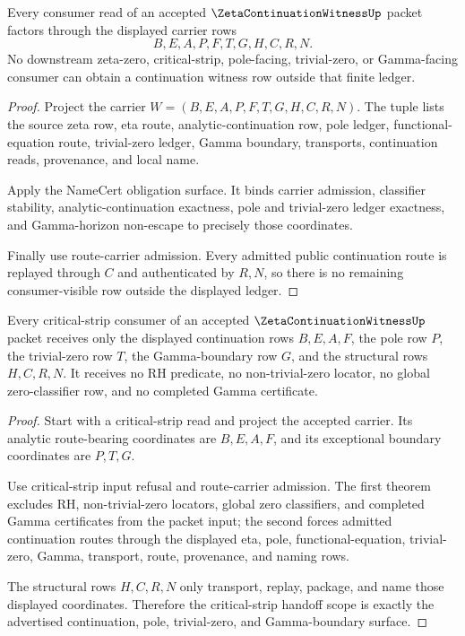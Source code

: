\begin{theorem}
\label{thm:zeta-continuation-witness-consumer-ledger-exhaustion}
Every consumer read of an accepted $\ZetaContinuationWitnessUp$ packet factors through the displayed carrier rows
$$
B,E,A,P,F,T,G,H,C,R,N.
$$
No downstream zeta-zero, critical-strip, pole-facing, trivial-zero, or Gamma-facing consumer can obtain a continuation witness row outside that finite ledger.
\end{theorem}
\begin{proof}
Project the carrier $W=(B,E,A,P,F,T,G,H,C,R,N)$. The tuple lists the source zeta row, eta route, analytic-continuation row, pole ledger, functional-equation route, trivial-zero ledger, Gamma boundary, transports, continuation reads, provenance, and local name.

Apply the NameCert obligation surface. It binds carrier admission, classifier stability, analytic-continuation exactness, pole and trivial-zero ledger exactness, and Gamma-horizon non-escape to precisely those coordinates.

Finally use route-carrier admission. Every admitted public continuation route is replayed through $C$ and authenticated by $R,N$, so there is no remaining consumer-visible row outside the displayed ledger.
\end{proof}

\begin{theorem}
\label{thm:zeta-continuation-witness-critical-strip-handoff-scope}
Every critical-strip consumer of an accepted $\ZetaContinuationWitnessUp$ packet receives only the displayed continuation rows $B,E,A,F$, the pole row $P$, the trivial-zero row $T$, the Gamma-boundary row $G$, and the structural rows $H,C,R,N$. It receives no RH predicate, no non-trivial-zero locator, no global zero-classifier row, and no completed Gamma certificate.
\end{theorem}
\begin{proof}
Start with a critical-strip read and project the accepted carrier. Its analytic route-bearing coordinates are $B,E,A,F$, and its exceptional boundary coordinates are $P,T,G$.

Use critical-strip input refusal and route-carrier admission. The first theorem excludes RH, non-trivial-zero locators, global zero classifiers, and completed Gamma certificates from the packet input; the second forces admitted continuation routes through the displayed eta, pole, functional-equation, trivial-zero, Gamma, transport, route, provenance, and naming rows.

The structural rows $H,C,R,N$ only transport, replay, package, and name those displayed coordinates. Therefore the critical-strip handoff scope is exactly the advertised continuation, pole, trivial-zero, and Gamma-boundary surface.
\end{proof}

